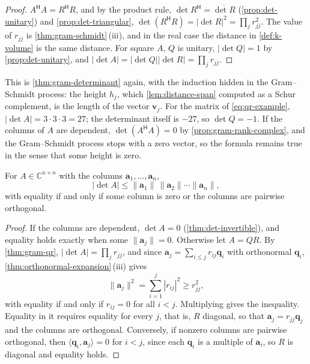 \begin{proof}
$A^{\mathsf H}A=R^{\mathsf H}R$, and by the product rule, $\det R^{\mathsf H}=\overline{\det R}$ (\cref{prop:det-unitary}) and \cref{prop:det-triangular}, $\det(R^{\mathsf H}R)=|\det R|^2=\prod_jr_{jj}^2$. The value of $r_{jj}$ is \cref{thm:gram-schmidt}\,(iii), and in the real case the distance in \cref{def:k-volume} is the same distance. For square $A$, $Q$ is unitary, $|\det Q|=1$ by \cref{prop:det-unitary}, and $|\det A|=|\det Q||\det R|=\prod_jr_{jj}$.
\end{proof}

This is \cref{thm:gram-determinant} again, with the induction hidden in the Gram--Schmidt process: the height $h_j$, which \cref{lem:distance-span} computed as a Schur complement, is the length of the vector $\mathbf v_j$. For the matrix of \eqref{eq:qr-example}, $|\det A|=3\cdot3\cdot3=27$; the determinant itself is $-27$, so $\det Q=-1$. If the columns of $A$ are dependent, $\det(A^{\mathsf H}A)=0$ by \cref{prop:gram-rank-complex}, and the Gram--Schmidt process stops with a zero vector, so the formula remains true in the sense that some height is zero.

\begin{theorem}
\label{thm:hadamard-complex}
For $A\in\mathbb C^{n\times n}$ with the columns $\mathbf a_1,\ldots,\mathbf a_n$,
\[
|\det A|\le\|\mathbf a_1\|\,\|\mathbf a_2\|\cdots\|\mathbf a_n\| ,
\]
with equality if and only if some column is zero or the columns are pairwise orthogonal.
\end{theorem}

\begin{proof}
If the columns are dependent, $\det A=0$ (\cref{thm:det-invertible}), and equality holds exactly when some $\|\mathbf a_j\|=0$. Otherwise let $A=QR$. By \cref{thm:gram-qr}, $|\det A|=\prod_jr_{jj}$, and since $\mathbf a_j=\sum_{i\le j}r_{ij}\mathbf q_i$ with orthonormal $\mathbf q_i$, \cref{thm:orthonormal-expansion}\,(iii) gives
\[
\|\mathbf a_j\|^2=\sum_{i=1}^j|r_{ij}|^2\ge r_{jj}^2 ,
\]
with equality if and only if $r_{ij}=0$ for all $i<j$. Multiplying gives the inequality. Equality in it requires equality for every $j$, that is, $R$ diagonal, so that $\mathbf a_j=r_{jj}\mathbf q_j$ and the columns are orthogonal. Conversely, if nonzero columns are pairwise orthogonal, then $\langle\mathbf q_i,\mathbf a_j\rangle=0$ for $i<j$, since each $\mathbf q_i$ is a multiple of $\mathbf a_i$, so $R$ is diagonal and equality holds.
\end{proof}

